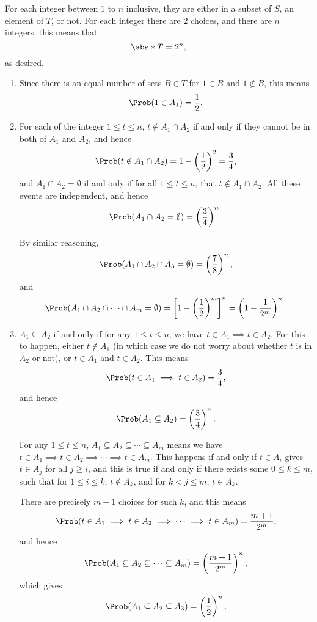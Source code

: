 \Question{\currfilebase}

For each integer between \(1\) to \(n\) inclusive, they are either in a subset of \(S\), an element of \(T\), or not. For each integer there are \(2\) choices, and there are \(n\) integers, this means that
\[
    \abs*{T} = 2^n,
\]
as desired.

\begin{enumerate}
    \item Since there is an equal number of sets \(B \in T\) for \(1 \in B\) and \(1 \notin B\), this means
          \[
              \Prob(1 \in A_1) = \frac{1}{2}.
          \]

    \item For each of the integer \(1 \leq t \leq n\), \(t \notin A_1 \cap A_2\) if and only if they cannot be in both of \(A_1\) and \(A_2\), and hence
          \[
              \Prob(t \notin A_1 \cap A_2) = 1 - \left(\frac{1}{2}\right)^2 = \frac{3}{4},
          \]
          and \(A_1 \cap A_2 = \emptyset\) if and only if for all \(1 \leq t \leq n\), that \(t \notin A_1 \cap A_2\). All these events are independent, and hence
          \[
              \Prob(A_1 \cap A_2 = \emptyset) = \left(\frac{3}{4}\right)^n.
          \]

          By similar reasoning,
          \[
              \Prob(A_1 \cap A_2 \cap A_3 = \emptyset) = \left(\frac{7}{8}\right)^n,
          \]
          and
          \[
              \Prob(A_1 \cap A_2 \cap \cdots \cap A_m = \emptyset) = \left[1 - \left(\frac{1}{2}\right)^m\right]^n = \left(1 - \frac{1}{2^m}\right)^n.
          \]

    \item \(A_1 \subseteq A_2\) if and only if for any \(1 \leq t \leq n\), we have \(t \in A_1 \implies t \in A_2\). For this to happen, either \(t \notin A_1\) (in which case we do not worry about whether \(t\) is in \(A_2\) or not), or \(t \in A_1\) and \(t \in A_2\). This means
          \[
              \Prob(t \in A_1 \implies t \in A_2) = \frac{3}{4},
          \]
          and hence
          \[
              \Prob(A_1 \subseteq A_2) = \left(\frac{3}{4}\right)^n.
          \]

          For any \(1 \leq t \leq n\), \(A_1 \subseteq A_2 \subseteq \cdots \subseteq A_m\) means we have \(t \in A_1 \implies t \in A_2 \implies \cdots \implies t \in A_m\). This happens if and only if \(t \in A_i\) gives \(t \in A_j\) for all \(j \geq i\), and this is true if and only if there exists some \(0 \leq k \leq m\), such that for \(1 \leq i \leq k\), \(t \notin A_k\), and for \(k < j \leq m\), \(t \in A_k\).

          There are precisely \(m + 1\) choices for such \(k\), and this means
          \[
              \Prob(t \in A_1 \implies t \in A_2 \implies \cdots \implies t \in A_m) = \frac{m + 1}{2^m},
          \]
          and hence
          \[
              \Prob(A_1 \subseteq A_2 \subseteq \cdots \subseteq A_m) = \left(\frac{m + 1}{2^m}\right)^n,
          \]
          which gives
          \[
              \Prob(A_1 \subseteq A_2 \subseteq A_3) = \left(\frac{1}{2}\right)^n.
          \]
\end{enumerate}